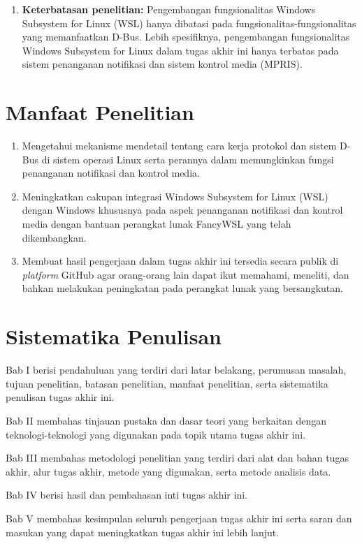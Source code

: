 \begin{enumerate}
    \item \textbf{Keterbatasan penelitian:} Pengembangan fungsionalitas Windows Subsystem for Linux (WSL) hanya dibatasi pada fungsionalitas-fungsionalitas yang memanfaatkan D-Bus. Lebih spesifiknya, pengembangan fungsionalitas Windows Subsystem for Linux dalam tugas akhir ini hanya terbatas pada sistem penanganan notifikasi dan sistem kontrol media (MPRIS).
\end{enumerate}


\section{Manfaat Penelitian}

\begin{enumerate}
    \item Mengetahui mekanisme mendetail tentang cara kerja protokol dan sistem D-Bus di sistem operasi Linux serta perannya dalam memungkinkan fungsi penanganan notifikasi dan kontrol media.

    \item Meningkatkan cakupan integrasi Windows Subsystem for Linux (WSL) dengan Windows khususnya pada aspek penanganan notifikasi dan kontrol media dengan bantuan perangkat lunak FancyWSL yang telah dikembangkan.

    \item Membuat hasil pengerjaan dalam tugas akhir ini tersedia secara publik di \textit{platform} GitHub agar orang-orang lain dapat ikut memahami, meneliti, dan bahkan melakukan peningkatan pada perangkat lunak yang bersangkutan.
\end{enumerate}


\section{Sistematika Penulisan}

\noindent Bab I berisi pendahuluan yang terdiri dari latar belakang, perumusan masalah, tujuan penelitian, batasan penelitian, manfaat penelitian, serta sistematika penulisan tugas akhir ini.

\noindent Bab II membahas tinjauan pustaka dan dasar teori yang berkaitan dengan teknologi-teknologi yang digunakan pada topik utama tugas akhir ini.

\noindent Bab III membahas metodologi penelitian yang terdiri dari alat dan bahan tugas akhir, alur tugas akhir, metode yang digunakan, serta metode analisis data.

\noindent Bab IV berisi hasil dan pembahasan inti tugas akhir ini.

\noindent Bab V membahas kesimpulan seluruh pengerjaan tugas akhir ini serta saran dan masukan yang dapat meningkatkan tugas akhir ini lebih lanjut.
